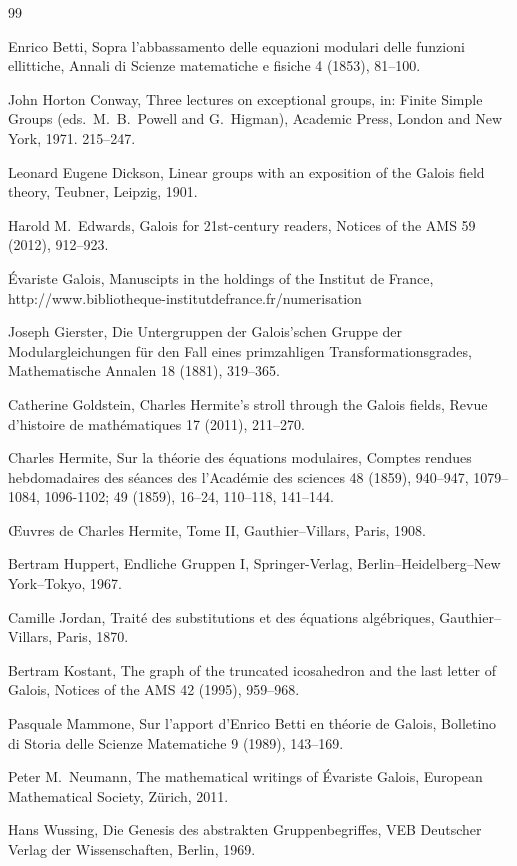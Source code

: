\documentclass[reqno,12pt]{amsart}
\theoremstyle{definition}
\begin{document}
\begin{thebibliography}{99}

Enrico Betti, Sopra l'abbassamento delle equazioni modulari delle funzioni ellittiche,
Annali di Scienze matematiche e fisiche 4 (1853), 81--100.

John Horton Conway, Three lectures on exceptional groups,
in: Finite Simple Groups (eds.\ M.~B.~Powell and G.~Higman),
Academic Press, London and New York, 1971. 215--247.

Leonard Eugene Dickson, Linear groups with an exposition of the Galois field theory,
Teubner, Leipzig, 1901.

Harold M.~Edwards, Galois for 21st-century readers, Notices of the AMS 59 (2012), 912--923.

\'Evariste Galois, Manuscipts in the holdings of the Institut de France,
http://www.bibliotheque-institutdefrance.fr/numerisation

Joseph Gierster, Die Untergruppen der Galois'schen Gruppe der Modulargleichungen f\"ur den
Fall eines primzahligen Transformations\-grades, Mathematische Annalen 18 (1881), 319--365.

Catherine Goldstein, Charles Hermite's stroll through the Galois fields,
Revue d'histoire de math\'ematiques 17 (2011), 211--270.

Charles Hermite, Sur la th\'eorie des \'equations modulaires, Comptes rendues hebdomadaires
des s\'eances des l'Acad\'emie des sciences 48 (1859), 940--947, 1079--1084, 1096-1102;
49 (1859), 16--24, 110--118, 141--144.

\OE uvres de Charles Hermite, Tome II, Gauthier--Villars, Paris, 1908.

Bertram Huppert, Endliche Gruppen I, Springer-Verlag, Berlin--Heidelberg--New York--Tokyo, 1967.

Camille Jordan, Trait\'e des substitutions et des \'equations alg\'ebriques, Gauthier--Villars, Paris, 1870.

Bertram Kostant, The graph of the truncated icosahedron and the last letter of Galois,
Notices of the AMS 42 (1995), 959--968.

Pasquale Mammone, Sur l'apport d'Enrico Betti en th\'eorie de Galois, Bolletino di Storia delle Scienze Matematiche 9 (1989), 143--169.

Peter M.\ Neumann, The mathematical writings of \'Evariste Galois, European Mathematical Society,
Z\"urich, 2011.

Hans Wussing, Die Genesis des abstrakten Gruppenbegriffes, VEB Deutscher Verlag der Wissenschaften, Berlin, 1969.

\end{thebibliography}
\end{document}
